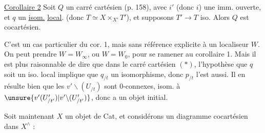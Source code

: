 
\uline{Corollaire 2} Soit $Q$ un carré cartésien (p. 158), avec $i'$ (donc  $i$) une imm. ouverte, et $q$  un \uline{isom.} \uline{local}.   (donc $T\simeq X\times_{X'}T'$), et supposons $T'\longrightarrow T$ iso. Alors $Q$ est cocartésien.

C'est un cas particulier du cor. 1, mais sans référence explicite à un localiseur $W$. On peut prendre $W=W_\infty$, ou $W=W_0$, pour se ramener au corollaire 1. Mais il est plus raisonnable de dire que dans le carré cartésien $(*)$, l'hypothèse que $q$ soit un iso. local implique que $q_{/t}$  un isomorphisme, donc $p_{/t}$ l'est aussi. Il en résulte bien que les $v'\backslash(U_{/t})$ sont $0$-connexes,      isom. à $\unsure{v'(U'_{/t'})|v'\backslash(U'_{/t'})}$, donc a un objet initial.

 Soit maintenant $X$ un objet de Cat, et considérons un diagramme cocartésien dans $X^\wedge$ :

